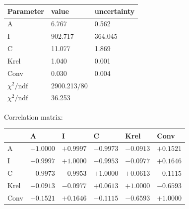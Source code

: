 \begin{tabular}{l|ll}
Parameter & value & uncertainty \\ \hline
 A & 6.767 & 0.562 \\ 
 I & 902.717 & 364.045 \\ 
 C & 11.077 & 1.869 \\ 
 Krel & 1.040 & 0.001 \\ 
 Conv & 0.030 & 0.004 \\ 
 \hline
 $\chi^2/\mathrm{ndf}$ & 2900.213/80 & \\
 $\chi^2/\mathrm{ndf}$ & 36.253 & \\
\end{tabular}

Correlation matrix:

\begin{tabular}{l|lllll} 
 & A & I & C & Krel & Conv \\ \hline
 A & $+1.0000$ & $+0.9997$ & $-0.9973$ & $-0.0913$ & $+0.1521$ \\ 
 I & $+0.9997$ & $+1.0000$ & $-0.9953$ & $-0.0977$ & $+0.1646$ \\ 
 C & $-0.9973$ & $-0.9953$ & $+1.0000$ & $+0.0613$ & $-0.1115$ \\ 
 Krel & $-0.0913$ & $-0.0977$ & $+0.0613$ & $+1.0000$ & $-0.6593$ \\ 
 Conv & $+0.1521$ & $+0.1646$ & $-0.1115$ & $-0.6593$ & $+1.0000$ \\ 
\end{tabular}
